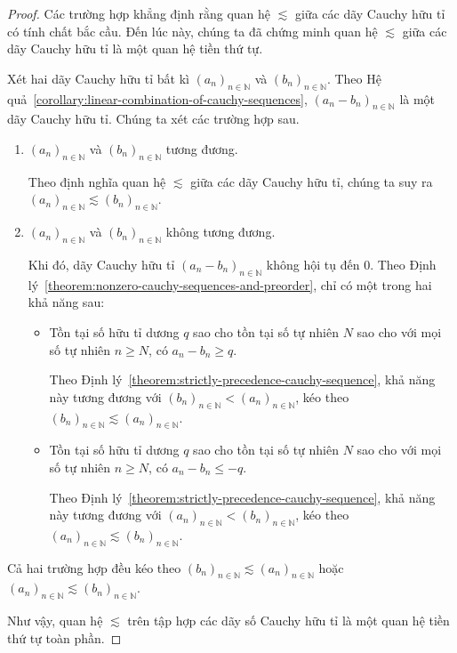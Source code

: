 \begin{proof}
    Các trường hợp khẳng định rằng quan hệ $\lesssim$ giữa các dãy Cauchy hữu tỉ có tính chất bắc cầu. Đến lúc này, chúng ta đã chứng minh quan hệ $\lesssim$ giữa các dãy Cauchy hữu tỉ là một quan hệ tiền thứ tự.

    Xét hai dãy Cauchy hữu tỉ bất kì ${(a_{n})}_{n\in\mathbb{N}}$ và ${(b_{n})}_{n\in\mathbb{N}}$. Theo Hệ quả~\ref{corollary:linear-combination-of-cauchy-sequences}, ${(a_{n} - b_{n})}_{n\in\mathbb{N}}$ là một dãy Cauchy hữu tỉ. Chúng ta xét các trường hợp sau.
    \begin{enumerate}[label={\textbf{Trường hợp \arabic*.}},itemindent=2cm]
        \item ${(a_{n})}_{n\in\mathbb{N}}$ và ${(b_{n})}_{n\in\mathbb{N}}$ tương đương.

              Theo định nghĩa quan hệ $\lesssim$ giữa các dãy Cauchy hữu tỉ, chúng ta suy ra ${(a_{n})}_{n\in\mathbb{N}}\lesssim {(b_{n})}_{n\in\mathbb{N}}$.
        \item ${(a_{n})}_{n\in\mathbb{N}}$ và ${(b_{n})}_{n\in\mathbb{N}}$ không tương đương.

              Khi đó, dãy Cauchy hữu tỉ ${(a_{n} - b_{n})}_{n\in\mathbb{N}}$ không hội tụ đến $0$. Theo Định lý~\ref{theorem:nonzero-cauchy-sequences-and-preorder}, chỉ có một trong hai khả năng sau:
              \begin{itemize}
                  \item Tồn tại số hữu tỉ dương $q$ sao cho tồn tại số tự nhiên $N$ sao cho với mọi số tự nhiên $n\geq N$, có $a_{n} - b_{n}\geq q$.

                        Theo Định lý~\ref{theorem:strictly-precedence-cauchy-sequence}, khả năng này tương đương với ${(b_{n})}_{n\in\mathbb{N}} < {(a_{n})}_{n\in\mathbb{N}}$, kéo theo ${(b_{n})}_{n\in\mathbb{N}}\lesssim {(a_{n})}_{n\in\mathbb{N}}$.
                  \item Tồn tại số hữu tỉ dương $q$ sao cho tồn tại số tự nhiên $N$ sao cho với mọi số tự nhiên $n\geq N$, có $a_{n} - b_{n}\leq -q$.

                        Theo Định lý~\ref{theorem:strictly-precedence-cauchy-sequence}, khả năng này tương đương với ${(a_{n})}_{n\in\mathbb{N}} < {(b_{n})}_{n\in\mathbb{N}}$, kéo theo ${(a_{n})}_{n\in\mathbb{N}}\lesssim {(b_{n})}_{n\in\mathbb{N}}$.
              \end{itemize}
    \end{enumerate}

    Cả hai trường hợp đều kéo theo ${(b_{n})}_{n\in\mathbb{N}}\lesssim {(a_{n})}_{n\in\mathbb{N}}$ hoặc ${(a_{n})}_{n\in\mathbb{N}}\lesssim {(b_{n})}_{n\in\mathbb{N}}$.

    Như vậy, quan hệ $\lesssim$ trên tập hợp các dãy số Cauchy hữu tỉ là một quan hệ tiền thứ tự toàn phần.
\end{proof}

